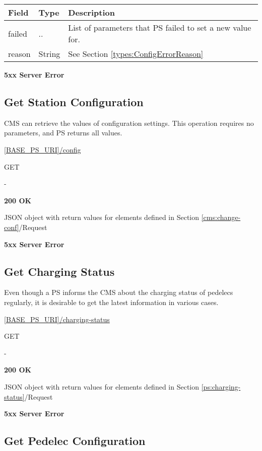 \begin{tabularx}{\linewidth}{ | l | l | X | }
  \hline
  \rowcolor{table-head}
  Field & Type & Description \\
  \hline
  failed	 & ..	& List of parameters that \acs{PS} failed to set a new value for.\\
  reason & String	& See Section \ref{types:ConfigErrorReason} \\
  \hline
\end{tabularx}

\textbf{5xx Server Error}

\subsection{Get Station Configuration}

\acs{CMS} can retrieve the values of configuration settings. This operation requires no parameters, and \acs{PS} returns all values.

 \url{[BASE_PS_URI]/config}

 GET

 -

 \textbf{200 OK}

JSON object with return values for elements defined in Section \ref{cms:change-conf}/Request

 \textbf{5xx Server Error}

\subsection{Get Charging Status}

Even though a \acs{PS} informs the \acs{CMS} about the charging status of pedelecs regularly, it is desirable to get the latest information in various cases.

 \url{[BASE_PS_URI]/charging-status}

 GET

 -

 \textbf{200 OK}

JSON object with return values for elements defined in Section \ref{ps:charging-status}/Request

 \textbf{5xx Server Error}

\subsection{Get Pedelec Configuration}

